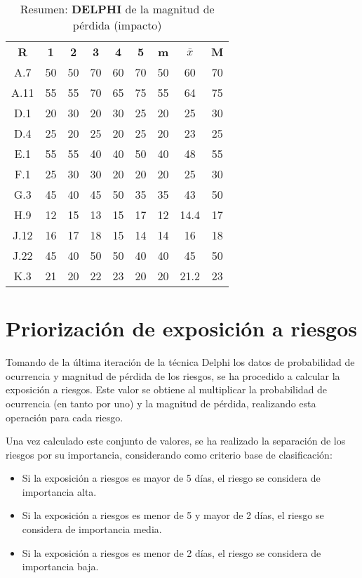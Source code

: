 \documentclass[11pt,a4paper,spanish,twoside]{book}
\begin{document}
\begin{table}[!h]
  \centering
  \begin{tabular}{|c||c|c|c|c|c||c|c|c|}
    \hline
    \textbf{R} & \textbf{1} & \textbf{2} & \textbf{3} & \textbf{4} &
    \textbf{5} & \textbf{m} &\textbf{$\bar{x}$} &\textbf{M} \\
    A.7  & 50 & 50 & 70 & 60 & 70 & 50 & 60   & 70 \\ \hline
    A.11 & 55 & 55 & 70 & 65 & 75 & 55 & 64   & 75 \\ \hline
    D.1  & 20 & 30 & 20 & 30 & 25 & 20 & 25   & 30 \\ \hline
    D.4  & 25 & 20 & 25 & 20 & 25 & 20 & 23   & 25 \\ \hline
    E.1  & 55 & 55 & 40 & 40 & 50 & 40 & 48   & 55 \\ \hline
    F.1  & 25 & 30 & 30 & 20 & 20 & 20 & 25   & 30 \\ \hline
    G.3  & 45 & 40 & 45 & 50 & 35 & 35 & 43   & 50 \\ \hline
    H.9  & 12 & 15 & 13 & 15 & 17 & 12 & 14.4 & 17 \\ \hline
    J.12 & 16 & 17 & 18 & 15 & 14 & 14 & 16   & 18 \\ \hline
    J.22 & 45 & 40 & 50 & 50 & 40 & 40 & 45   & 50 \\ \hline
    K.3  & 21 & 20 & 22 & 23 & 20 & 20 & 21.2 & 23 \\ \hline
  \end{tabular}
  \caption{Resumen: \textbf{DELPHI} de la magnitud de pérdida (impacto)}
\label{Tab:ResDELPHIpro}
\end{table}

\chapter{Priorización de exposición a riesgos}
Tomando de la última iteración de la técnica Delphi los datos de probabilidad
de ocurrencia y magnitud de pérdida de los riesgos, se ha procedido a
calcular la exposición a riesgos. Este valor se obtiene al multiplicar la
probabilidad de ocurrencia (en tanto por uno) y la magnitud de pérdida,
realizando esta operación para cada riesgo.

Una vez calculado este conjunto de valores, se ha realizado la separación de
los riesgos por su importancia, considerando como criterio base de
clasificación:

\begin{itemize}
\item Si la exposición a riesgos es mayor de 5 días, el riesgo se considera de
  importancia alta.
\item Si la exposición a riesgos es menor de 5 y mayor de 2 días, el riesgo se
  considera de importancia media.
\item Si la exposición a riesgos es menor de 2 días, el riesgo se considera
  de importancia baja.
\end{itemize}
\end{document}
